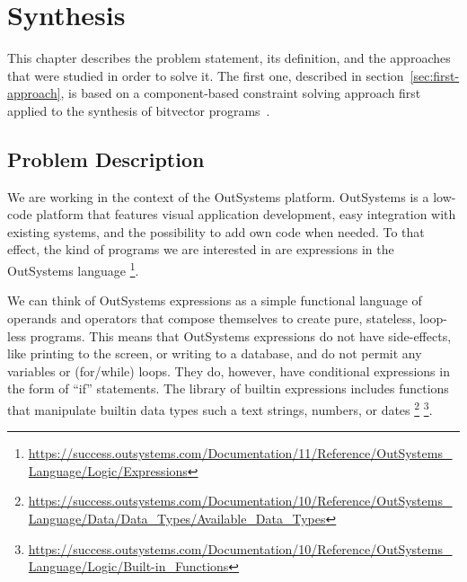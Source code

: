 \chapter{Synthesis}
\label{chap:synthesis}

This chapter describes the problem statement, its definition, and the approaches
that were studied in order to solve it. The first one, described in
section~\ref{sec:first-approach}, is based on a component-based constraint
solving approach first applied to the synthesis of bitvector
programs~\cite{Gulwani:2011:SLP, Jha:oracle:2010}.

\section{Problem Description}
\label{sec:problem-description}

We are working in the context of the OutSystems platform. OutSystems is a
low-code platform that features visual application development, easy integration
with existing systems, and the possibility to add own code when needed. To that
effect, the kind of programs we are interested in are expressions in the
OutSystems language
\footnote{\url{https://success.outsystems.com/Documentation/11/Reference/OutSystems_Language/Logic/Expressions}}.

We can think of OutSystems expressions as a simple functional language of
operands and operators that compose themselves to create pure, stateless,
loop-less programs. This means that OutSystems expressions do not have
side-effects, like printing to the screen, or writing to a database, and do not
permit any variables or (for/while) loops. They do, however, have conditional
expressions in the form of ``if'' statements. The library of builtin expressions
includes functions that manipulate builtin data types such a text strings,
numbers, or dates
\footnote{\url{https://success.outsystems.com/Documentation/10/Reference/OutSystems_Language/Data/Data_Types/Available_Data_Types}}
\footnote{\url{https://success.outsystems.com/Documentation/10/Reference/OutSystems_Language/Logic/Built-in_Functions}}.

